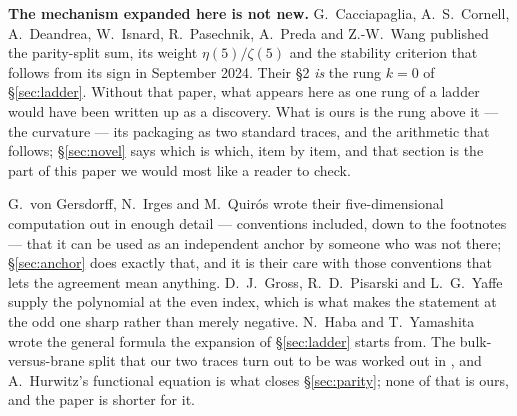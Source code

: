 \documentclass[11pt,a4paper]{article}
\begin{document}
\textbf{The mechanism expanded here is not new.} G.~Cacciapaglia, A.~S.~Cornell, A.~Deandrea,
W.~Isnard, R.~Pasechnik, A.~Preda and Z.-W.~Wang \cite{CCD24} published the parity-split sum, its
weight $\eta(5)/\zeta(5)$ and the stability criterion that follows from its sign in September 2024.
Their \S2 \emph{is} the rung $k=0$ of \S\ref{sec:ladder}. Without that paper, what appears here as
one rung of a ladder would have been written up as a discovery. What is ours is the rung above it
--- the curvature --- its packaging as two standard traces, and the arithmetic that follows;
\S\ref{sec:novel} says which is which, item by item, and that section is the part of this paper we
would most like a reader to check.

G.~von Gersdorff, N.~Irges and M.~Quir\'os \cite{vGIQ} wrote their five-dimensional computation out
in enough detail --- conventions included, down to the footnotes --- that it can be used as an
independent anchor by someone who was not there; \S\ref{sec:anchor} does exactly that, and it is
their care with those conventions that lets the agreement mean anything. D.~J.~Gross, R.~D.~Pisarski
and L.~G.~Yaffe \cite{GPY} supply the polynomial at the even index, which is what makes the
statement at the odd one sharp rather than merely negative. N.~Haba and T.~Yamashita \cite{HY04}
wrote the general formula the expansion of \S\ref{sec:ladder} starts from. The bulk-versus-brane
split that our two traces turn out to be was worked out in
\cite{vGQ03,SS04,GNH05,GLS06}, and A.~Hurwitz's functional equation \cite{Hurwitz1882,Apostol} is
what closes \S\ref{sec:parity}; none of that is ours, and the paper is shorter for it.

\end{document}
